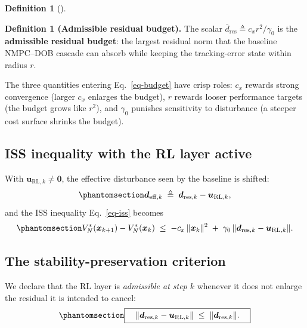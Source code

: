 \documentclass[
  11pt,
]{article}
\theoremstyle{plain}
\theoremstyle{plain}
\theoremstyle{definition}
\newtheorem{definition}{Definition}[section]
\theoremstyle{remark}
\begin{document}
\begin{definition}[]\protect\hypertarget{def-budget}{}\label{def-budget}

\textbf{Definition 1 (Admissible residual budget).} The scalar
\(\bar{d}_{\mathrm{res}} \triangleq c_x r^2 / \gamma_0\) is the
\textbf{admissible residual budget}: the largest residual norm that the
baseline NMPC--DOB cascade can absorb while keeping the tracking-error
state within radius \(r\).

\end{definition}

The three quantities entering Eq.~\ref{eq-budget} have crisp roles:
\(c_x\) rewards strong convergence (larger \(c_x\) enlarges the budget),
\(r\) rewards looser performance targets (the budget grows like
\(r^2\)), and \(\gamma_0\) punishes sensitivity to disturbance (a
steeper cost surface shrinks the budget).

\subsection{ISS inequality with the RL layer
active}\label{iss-inequality-with-the-rl-layer-active}

With \(\bm{u}_{\mathrm{RL},k} \ne \bm{0}\), the effective disturbance
seen by the baseline is shifted:
\begin{equation}\protect\phantomsection\label{eq-deff}{
\bm{d}_{\mathrm{eff},k}
\;\triangleq\;
\bm{d}_{\mathrm{res},k} - \bm{u}_{\mathrm{RL},k},
}\end{equation} and the ISS inequality Eq.~\ref{eq-iss} becomes
\begin{equation}\protect\phantomsection\label{eq-iss-with-rl}{
V_N^*(\bm{x}_{k+1}) - V_N^*(\bm{x}_k)
\;\le\;
-c_x\,\|\bm{x}_k\|^2
\;+\; \gamma_0\,\|\bm{d}_{\mathrm{res},k} - \bm{u}_{\mathrm{RL},k}\|.
}\end{equation}

\subsection{The stability-preservation
criterion}\label{the-stability-preservation-criterion}

We declare that the RL layer is \emph{admissible at step \(k\)} whenever
it does not enlarge the residual it is intended to cancel:
\begin{equation}\protect\phantomsection\label{eq-criterion}{
\boxed{\quad
\|\bm{d}_{\mathrm{res},k} - \bm{u}_{\mathrm{RL},k}\|
\;\le\; \|\bm{d}_{\mathrm{res},k}\|.
\quad}
}\end{equation}
\end{document}

